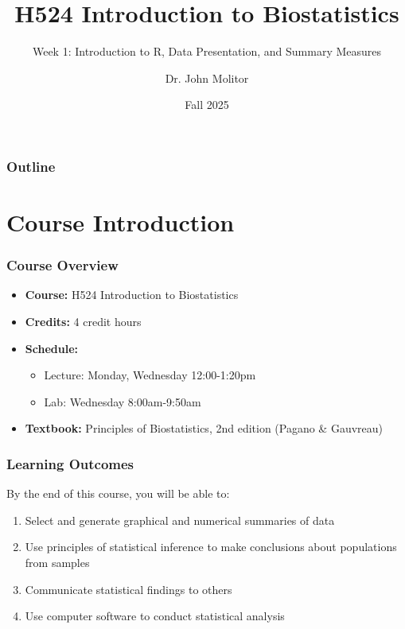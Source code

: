 \documentclass{beamer}
\title{H524 Introduction to Biostatistics}
\subtitle{Week 1: Introduction to R, Data Presentation, and Summary Measures}
\author{Dr. John Molitor}
\institute{}
\date{Fall 2025}
\begin{document}
\frame{\titlepage}

\begin{frame}
\frametitle{Outline}
\tableofcontents
\end{frame}

\section{Course Introduction}

\begin{frame}
\frametitle{Course Overview}
\begin{itemize}
\item \textbf{Course:} H524 Introduction to Biostatistics
\item \textbf{Credits:} 4 credit hours
\item \textbf{Schedule:}
  \begin{itemize}
  \item Lecture: Monday, Wednesday 12:00-1:20pm
  \item Lab: Wednesday 8:00am-9:50am
  \end{itemize}
\item \textbf{Textbook:} Principles of Biostatistics, 2nd edition (Pagano \& Gauvreau)
\end{itemize}
\end{frame}

\begin{frame}
\frametitle{Learning Outcomes}
By the end of this course, you will be able to:
{\color{black}
\begin{enumerate}
\item Select and generate graphical and numerical summaries of data
\item Use principles of statistical inference to make conclusions about populations from samples
\item Communicate statistical findings to others
\item Use computer software to conduct statistical analysis
\end{enumerate}
}
\end{frame}
\end{document}
